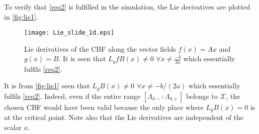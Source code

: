 To verify that \autoref{req2} is fulfilled in the simulation, the Lie derivatives are plotted in \autoref{fig:lie1}.
\begin{figure}[H]
	\center
		\texttt{[image: Lie\_slide\_1d.eps]}
	\caption{Lie derivatives of the CBF along the vector fields $f(x) = Ax$ and $g(x)=B$. It is seen that $L_gfB(x) \neq 0 \,\, \forall x \neq \frac{-b}{2a}$ which essentially fulfils \autoref{req2}.}
	\label{fig:lie1}
\end{figure}
It is from \autoref{fig:lie1} seen that $L_gB(x) \neq 0 \,\, \forall x \neq -b/(2a)$ which essentially fulfils \autoref{req2}. Indeed, even if the entire range $[\Lambda_{h-}:\Lambda_{h+}]$ belongs to $\mathcal{X}$, the chosen CBF would have been valid because the only place where $L_gB(x) = 0$ is at the critical point. Note also that the Lie derivatives are independent of the scalar $\kappa$.
\vspace{-0.3cm}
